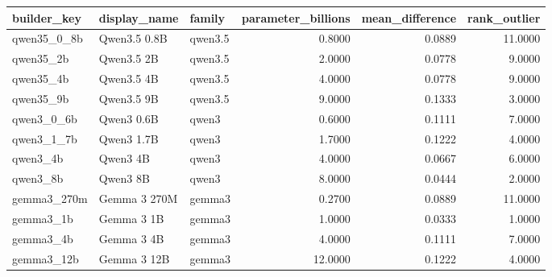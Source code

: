\begin{tabular}{lllrrr}
\toprule
builder_key & display_name & family & parameter_billions & mean_difference & rank_outlier \\
\midrule
qwen35_0_8b & Qwen3.5 0.8B & qwen3.5 & 0.8000 & 0.0889 & 11.0000 \\
qwen35_2b & Qwen3.5 2B & qwen3.5 & 2.0000 & 0.0778 & 9.0000 \\
qwen35_4b & Qwen3.5 4B & qwen3.5 & 4.0000 & 0.0778 & 9.0000 \\
qwen35_9b & Qwen3.5 9B & qwen3.5 & 9.0000 & 0.1333 & 3.0000 \\
qwen3_0_6b & Qwen3 0.6B & qwen3 & 0.6000 & 0.1111 & 7.0000 \\
qwen3_1_7b & Qwen3 1.7B & qwen3 & 1.7000 & 0.1222 & 4.0000 \\
qwen3_4b & Qwen3 4B & qwen3 & 4.0000 & 0.0667 & 6.0000 \\
qwen3_8b & Qwen3 8B & qwen3 & 8.0000 & 0.0444 & 2.0000 \\
gemma3_270m & Gemma 3 270M & gemma3 & 0.2700 & 0.0889 & 11.0000 \\
gemma3_1b & Gemma 3 1B & gemma3 & 1.0000 & 0.0333 & 1.0000 \\
gemma3_4b & Gemma 3 4B & gemma3 & 4.0000 & 0.1111 & 7.0000 \\
gemma3_12b & Gemma 3 12B & gemma3 & 12.0000 & 0.1222 & 4.0000 \\
\bottomrule
\end{tabular}
